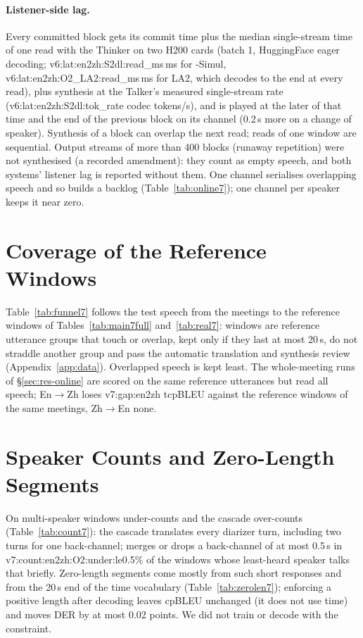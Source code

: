 \paragraph{Listener-side lag.} Every committed block gets its commit time plus the median single-stream time of one read
with the Thinker on two H200 cards (batch 1, HuggingFace eager decoding; \num{v6:lat:en2zh:S2dl:read_ms}\,ms for
\sys{}-Simul, \num{v6:lat:en2zh:O2_LA2:read_ms}\,ms for LA2, which decodes to the end at every read), plus synthesis at
the Talker's measured single-stream rate (\num{v6:lat:en2zh:S2dl:tok_rate} codec tokens/s), and is played at the later of
that time and the end of the previous block on its channel (0.2\,s more on a change of speaker). Synthesis of a block can
overlap the next read; reads of one window are sequential. Output streams of more than 400 blocks (runaway repetition)
were not synthesised (a recorded amendment): they count as empty speech, and both systems' listener lag is reported
without them. One channel serialises overlapping speech and so builds a backlog (Table~\ref{tab:online7}); one channel per
speaker keeps it near zero.

\section{Coverage of the Reference Windows}
\label{app:funnel7}



Table~\ref{tab:funnel7} follows the test speech from the meetings to the reference windows of Tables~\ref{tab:main7full}
and~\ref{tab:real7}: windows are reference utterance groups that touch or overlap, kept only if they last at most 20\,s,
do not straddle another group and pass the automatic translation and synthesis review (Appendix~\ref{app:data}).
Overlapped speech is kept least. The whole-meeting runs of \S\ref{sec:res-online} are scored on the same reference
utterances but read all speech; En$\rightarrow$Zh loses \num{v7:gap:en2zh} tcpBLEU against the reference windows of the same
meetings, Zh$\rightarrow$En none.

\section{Speaker Counts and Zero-Length Segments}
\label{app:count7}




On multi-speaker windows \sys{} under-counts and the cascade over-counts (Table~\ref{tab:count7}): the cascade translates
every diarizer turn, including two turns for one back-channel; \sys{} merges or drops a back-channel of at most 0.5\,s in
\num{v7:count:en2zh:O2:under:le0.5}\% of the windows whose least-heard speaker talks that briefly. Zero-length segments
come mostly from such short responses and from the 20\,s end of the time vocabulary (Table~\ref{tab:zerolen7}); enforcing a
positive length after decoding leaves cpBLEU unchanged (it does not use time) and moves DER by at most 0.02 points. We did
not train or decode with the constraint.

